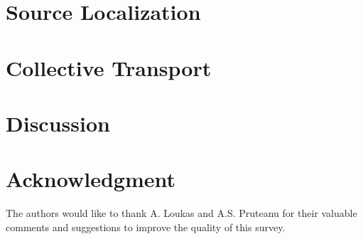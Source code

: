 \documentclass[a4paper]{article}
\begin{document}
\section{Source Localization}
  \label{sec:Localization}
  

\section{Collective Transport}
  \label{sec:CollectiveTransport}
  

\section{Discussion}
  \label{sec:Discussion}
  

\section*{Acknowledgment}
The authors would like to thank A. Loukas and A.S. Pruteanu for their valuable comments and suggestions to improve the quality of this survey.

\clearpage


\end{document}
